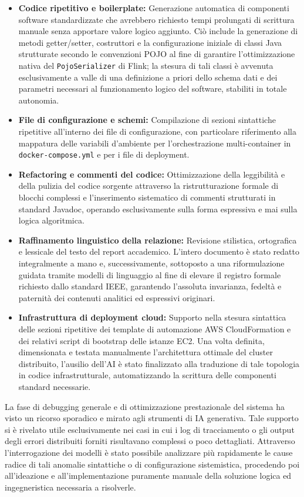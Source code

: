 \documentclass[conference]{IEEEtran}
\begin{document}
\begin{itemize}
    \item \textbf{Codice ripetitivo e boilerplate:} Generazione automatica di componenti software standardizzate che avrebbero richiesto tempi prolungati di scrittura manuale senza apportare valore logico aggiunto. Ciò include la generazione di metodi getter/setter, costruttori e la configurazione iniziale di classi Java strutturate secondo le convenzioni POJO al fine di garantire l'ottimizzazione nativa del \texttt{PojoSerializer} di Flink; la stesura di tali classi è avvenuta esclusivamente a valle di una definizione a priori dello schema dati e dei parametri necessari al funzionamento logico del software, stabiliti in totale autonomia.
    \item \textbf{File di configurazione e schemi:} Compilazione di sezioni sintattiche ripetitive all'interno dei file di configurazione, con particolare riferimento alla mappatura delle variabili d'ambiente per l'orchestrazione multi-container in \texttt{docker-compose.yml} e per i file di deployment.
    \item \textbf{Refactoring e commenti del codice:} Ottimizzazione della leggibilità e della pulizia del codice sorgente attraverso la ristrutturazione formale di blocchi complessi e l'inserimento sistematico di commenti strutturati in standard Javadoc, operando esclusivamente sulla forma espressiva e mai sulla logica algoritmica.
    \item \textbf{Raffinamento linguistico della relazione:} Revisione stilistica, ortografica e lessicale del testo del report accademico. L'intero documento è stato redatto integralmente a mano e, successivamente, sottoposto a una riformulazione guidata tramite modelli di linguaggio al fine di elevare il registro formale richiesto dallo standard IEEE, garantendo l'assoluta invarianza, fedeltà e paternità dei contenuti analitici ed espressivi originari.
    \item \textbf{Infrastruttura di deployment cloud:} Supporto nella stesura sintattica delle sezioni ripetitive dei template di automazione AWS CloudFormation e dei relativi script di bootstrap delle istanze EC2. Una volta definita, dimensionata e testata manualmente l'architettura ottimale del cluster distribuito, l'ausilio dell'AI è stato finalizzato alla traduzione di tale topologia in codice infrastrutturale, automatizzando la scrittura delle componenti standard necessarie.
\end{itemize}

La fase di debugging generale e di ottimizzazione prestazionale del sistema ha visto un ricorso sporadico e mirato agli strumenti di IA generativa. 
Tale supporto si è rivelato utile esclusivamente nei casi in cui i log di tracciamento o gli output degli errori distribuiti forniti risultavano complessi o poco dettagliati. 
Attraverso l'interrogazione dei modelli è stato possibile analizzare più rapidamente le cause radice di tali anomalie sintattiche o di configurazione sistemistica, procedendo poi all'ideazione e all'implementazione puramente manuale della soluzione logica ed ingegneristica necessaria a risolverle.
\end{document}
